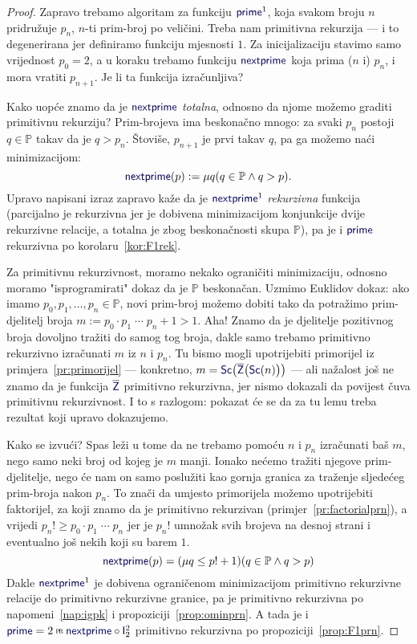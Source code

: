 \begin{proof}
    Zapravo trebamo algoritam za funkciju $\f{prime}^1$, koja svakom broju $n$ pridružuje $p_n$, $n$-ti prim-broj po veličini. Treba nam primitivna rekurzija --- i to degenerirana jer definiramo funkciju mjesnosti $1$. Za inicijalizaciju stavimo samo vrijednost $p_0=2$, a u koraku trebamo funkciju $\f{nextprime}$ koja prima ($n$ i) $p_n$, i mora vratiti $p_{n+1}$. Je li ta funkcija izračunljiva?

	Kako uopće znamo da je $\f{nextprime}$ \emph{totalna}, odnosno da njome možemo graditi primitivnu rekurziju? Prim-brojeva ima beskonačno mnogo: za svaki $p_n$ postoji $q\in\mathbb P$ takav da je $q>p_n$. Štoviše, $p_{n+1}$ je prvi takav $q$, pa ga možemo naći minimizacijom:
\begin{equation}\label{eq:primerek}
    \f{nextprime}(p):=\mu q(q\in\mathbb P\land q>p)\text.
\end{equation}
Upravo napisani izraz zapravo kaže da je $\f{nextprime}^1$ \emph{rekurzivna} funkcija (parcijalno je rekurzivna jer je dobivena minimizacijom konjunkcije dvije rekurzivne relacije, a totalna je zbog beskonačnosti skupa $\mathbb P$), pa je i $\f{prime}$ rekurzivna po korolaru~\ref{kor:F1rek}.

    Za primitivnu rekurzivnost, moramo nekako ograničiti minimizaciju, odnosno moramo "isprogramirati" dokaz da je $\mathbb P$ beskonačan. Uzmimo Euklidov dokaz: ako imamo $p_0,p_1,\dotsc,p_n\in\mathbb P$, novi prim-broj možemo dobiti tako da potražimo prim-djelitelj broja $m:=p_0\cdot p_1\mathbin{\dotsm}p_n+1>1$. Aha! Znamo da je djelitelje pozitivnog broja dovoljno tražiti do samog tog broja, dakle samo trebamo primitivno rekurzivno izračunati $m$ iz $n$ i $p_n$. Tu bismo mogli upotrijebiti primorijel iz primjera~\ref{pr:primorijel} --- konkretno, $m=\f{Sc}\bigl(\overline{\f Z}\bigl(\f{Sc}(n)\bigr)\bigr)$ --- ali nažalost još ne znamo da je funkcija $\overline{\f Z}$ primitivno rekurzivna, jer nismo dokazali da povijest čuva primitivnu rekurzivnost. I to s razlogom: pokazat će se da za tu lemu treba rezultat koji upravo dokazujemo.

    Kako se izvući? Spas leži u tome da ne trebamo pomoću $n$ i $p_n$ izračunati baš $m$, nego samo neki broj od kojeg je $m$ manji. Ionako nećemo tražiti njegove prim-djelitelje, nego će nam on samo poslužiti kao gornja granica za traženje sljedećeg prim-broja nakon $p_n$. To znači da umjesto primorijela možemo upotrijebiti faktorijel, za koji znamo da je primitivno rekurzivan (primjer~\ref{pr:factorialprn}), a vrijedi $p_n!\ge p_0\cdot p_1\mathbin{\dotsm}p_n$ jer je $p_n!$ umnožak svih brojeva na desnoj strani i eventualno još nekih koji su barem $1$.
\begin{equation}
    \f{nextprime}(p)=(\mu q\le p!+1)(q\in\mathbb P\land q>p)%
\end{equation}
	Dakle $\f{nextprime}^1$ je dobivena ograničenom minimizacijom primitivno rekurzivne relacije do primitivno rekurzivne granice, pa je primitivno rekurzivna po napomeni~\ref{nap:igpk} i propoziciji~\ref{prop:ominprn}. A tada je i $\f{prime}=2\pr\f{nextprime}\circ\f I_2^2$ primitivno rekurzivna po propoziciji~\ref{prop:F1prn}.
\end{proof}

